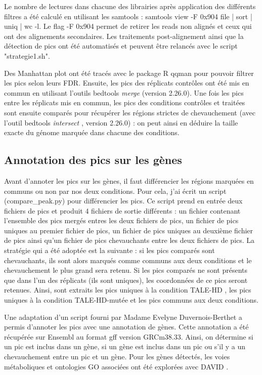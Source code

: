 \documentclass[a4paper,12pt,times]{report}
\begin{document}
\bigskip
Le nombre de lectures dans chacune des librairies après application des différents filtres a été calculé en utilisant les samtools : samtools view -F 0x904 file | sort | uniq | wc -l. 
\newline Le flag -F 0x904 permet de retirer les reads non alignés et ceux qui ont des alignements secondaires. 
\newline
Les traitements post-alignement ainsi que la détection de pics ont été automatisés et peuvent être relancés avec le script "strategie1.sh".

\bigskip
Des Manhattan plot ont été tracés avec le package R qqman pour pouvoir filtrer les pics selon leurs FDR.
Ensuite, les pics des réplicats contrôles ont été mis en commun en utilisant l'outils bedtools \textit{merge} \cite{bedtools} (version 2.26.0).
 \newline Une fois les pics entre les réplicats mis en commun, les pics des conditions contrôles et traitées sont ensuite comparés pour récupérer les régions strictes de chevauchement (avec l'outil bedtools \textit{intersect} \cite{bedtools}, version 2.26.0) : on peut ainsi en déduire la taille exacte du génome marquée dans chacune des conditions.
      
      \subsection{Annotation des pics sur les gènes}
Avant d'annoter les pics sur les gènes, il faut différencier les régions marquées en communs ou non par nos deux conditions. 
Pour cela,  j'ai écrit un script (compare\_peak.py) pour  différencier les pics. Ce script prend en entrée deux fichiers de pics et produit 4 fichiers de sortie différents : un fichier contenant l'ensemble des pics mergés entres les deux fichiers de pics, un fichier de pics uniques au premier fichier de pics, un fichier de pics uniques au deuxième fichier de pics ainsi qu'un fichier de pics chevauchants entre les deux fichiers de pics.
 La stratégie qui a été adoptée est la suivante : 
si les pics comparés sont chevauchants, ils sont alors marqués comme communs aux deux conditions et le chevauchement le plus grand sera retenu.
Si les pics comparés ne sont présents que dans l'un des réplicats (ils sont uniques), les coordonnées de ce pics seront retenues.
Ainsi, sont extraits les  pics uniques à la condition TALE-HD ,  les pics uniques à la condition TALE-HD-mutée et les pics communs aux deux conditions.

\bigskip
      Une adaptation d'un script fourni par Madame Evelyne Duvernois-Berthet a permis d'annoter les pics avec une annotation de gènes. Cette annotation a été récupérée sur Ensembl  au format gff version GRCm38.33.
      Ainsi, on détermine si un pic est inclus dans un gène, si un gène est inclus dans un pic ou s'il y a un chevauchement entre un pic et un gène.
         Pour les gènes détectés, les voies métaboliques et ontologies GO associées ont été explorées avec DAVID \cite{GO}.
      
\end{document}
